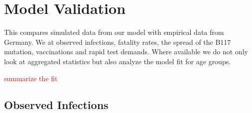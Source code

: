 \section{Model Validation}
\label{sec:model_validation}

This compares simulated data from our model with empirical data from Germany. We at
observed infections, fatality rates, the spread of the B117 mutation, vaccinations and
rapid test demands. Where available we do not only look at aggregated statistics but
also analyze the model fit for age groups.

\textcolor{red}{summarize the fit}


\subsection{Observed Infections}
\label{sub:in_sample_fit}




